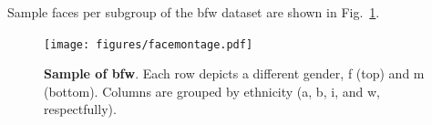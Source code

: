 Sample faces per subgroup of the \gls{bfw} dataset are shown in Fig.~\ref{fig:montage:app}.
\begin{figure}[h!]
    \centering
    \texttt{[image: figures/facemontage.pdf]}
    \caption{\textbf{Sample of \gls{bfw}}. Each row depicts a different gender, \gls{f} (top) and \gls{m} (bottom). Columns are grouped by ethnicity (\ie \gls{a}, \gls{b}, \gls{i}, and \gls{w}, respectfully).}
    \label{fig:montage:app}
\end{figure}

